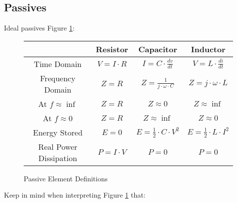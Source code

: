\documentclass[main.tex]{subfiles}
\begin{document}
\subsection{Passives}
Ideal passives Figure \ref{fig:passive definitions}:
\begin{figure}[h!]
    \centering
    \begin{tabular}{|c|c|c|c|}
        \hline
         & Resistor & Capacitor & Inductor \\ \hline
        Time Domain & $V = I \cdot R$ & $I = C \cdot \frac{dv}{dt}$ & $V = L \cdot \frac{di}{dt}$ \\ \hline
        Frequency Domain & $Z = R$ & $Z = \frac{1}{j \cdot \omega \cdot C}$ & $Z = j \cdot \omega \cdot L$ \\ \hline
        At $f \approx \inf$ & $Z = R$ & $Z \approx 0$ & $Z \approx \inf$ \\ \hline
        At $f \approx 0$ & $Z = R$ & $Z \approx \inf$ & $Z \approx 0$ \\ \hline
        Energy Stored & $E = 0$ & $E = \frac{1}{2} \cdot C \cdot V^{2}$ & $E = \frac{1}{2} \cdot L \cdot I^{2}$ \\ \hline
        Real Power Dissipation & $P = I \cdot V$ & $P = 0$ & $P = 0$ \\ \hline
    \end{tabular}
    \caption{Passive Element Definitions}
    \label{fig:passive definitions}
\end{figure}
Keep in mind when interpreting Figure \ref{fig:passive definitions} that:
\end{document}
